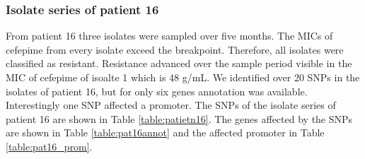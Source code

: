 \subsubsection{Isolate series of patient 16}
From patient 16 three isolates were sampled over five months. The MICs of cefepime from every isolate exceed the breakpoint. Therefore, all isolates were classified as resistant. Resistance advanced over the sample period visible in the MIC of cefepime of isoalte 1 which is 48 \textmu g/mL. We identified over 20 SNPs in the isolates of patient 16, but for only six genes annotation was available. Interestingly one SNP affected a promoter. The SNPs of the isolate series of patient 16 are shown in  Table \ref{table:patietn16}. The genes affected by the SNPs are shown in Table \ref{table:pat16annot} and the affected promoter in Table \ref{table:pat16_prom}.

